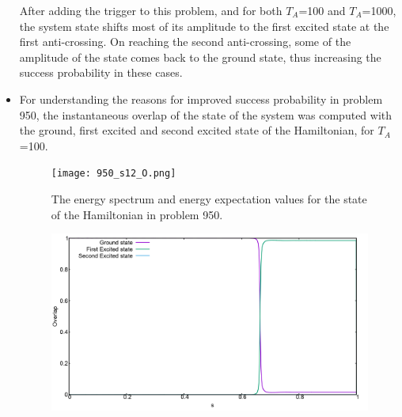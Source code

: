\documentclass[../main.tex]{subfiles}
\begin{document}
\begin{itemize}
After adding the trigger to this problem, and for both $T_A$=100 and $T_A$=1000, the system state shifts most of its amplitude to the first excited state at the first anti-crossing. On reaching the second anti-crossing, some of the amplitude of the state comes back to the ground state, thus increasing the success probability in these cases.

\item For understanding the reasons for improved success probability in problem 950, the instantaneous overlap of the state of the system was computed with the ground, first excited and second excited state of the Hamiltonian, for $T_A$=100. 

\begin{figure}[H]
\centering
  \texttt{[image: 950\_s12\_O.png]}
  \label{fig:a30}
  \caption{The energy spectrum and energy expectation values for the state of the Hamiltonian in problem 950.}
 \end{figure}

\begin{figure}[H]
  \centering
  \includegraphics[scale=0.24]{950_Overlap_Orig.png}
  \label{fig:a31}


\end{figure}
\end{itemize}
\end{document}
